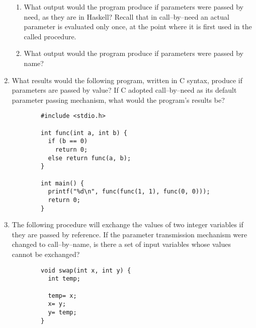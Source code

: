 \documentclass[11pt]{article}
\begin{document}
\begin{enumerate}
\begin{enumerate}
            \item What output would the program produce if parameters were
                  passed by need, as they are in Haskell?  Recall that in
                  call--by--need an actual parameter is evaluated only once,
                  at the point where it is first used in the called
                  procedure.

            \item What output would the program produce if parameters were
                  passed by name?

          \end{enumerate}

    \item What results would the following program, written in C syntax,
          produce if parameters are passed by value?  If C adopted
          call--by--need as its default parameter passing mechanism, what
          would the program's results be?

          \vspace{-1.5mm}

          \begin{Verbatim}
        #include <stdio.h>

        int func(int a, int b) {
          if (b == 0)
            return 0;
          else return func(a, b);
        }

        int main() {
          printf("%d\n", func(func(1, 1), func(0, 0)));
          return 0;
        }
          \end{Verbatim}

          \vspace{-2mm}

    \item The following procedure will exchange the values of two integer
          variables if they are passed by reference.  If the parameter
          transmission mechanism were changed to call--by--name, is there a
          set of input variables whose values cannot be exchanged?

          \vspace{-1.5mm}

          \begin{Verbatim}
        void swap(int x, int y) {
          int temp;

          temp= x;
          x= y;
          y= temp;
        }
          \end{Verbatim}

          \vspace{-2mm}


\end{enumerate}
\end{document}
